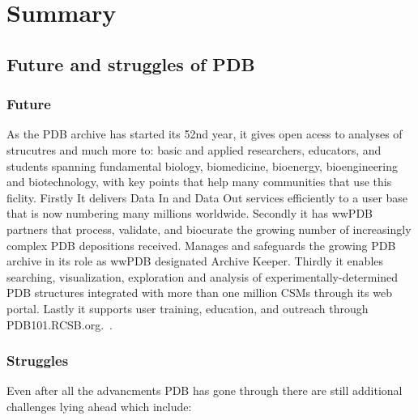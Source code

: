 \documentclass{report}
\begin{document}
\section{Summary}
\subsection{Future and struggles of PDB}
\subsubsection{Future}
As the PDB archive has started its 52nd year, it gives open acess to analyses of strucutres and much more to: basic and applied researchers, educators, and students spanning fundamental biology, biomedicine, bioenergy, bioengineering and biotechnology, with key points that help many communities that use this ficlity. Firstly It delivers Data In and Data Out services efficiently to a user base that is now numbering many millions worldwide. Secondly it has wwPDB partners that process, validate, and biocurate the growing number of increasingly complex PDB depositions received. Manages and safeguards the growing PDB archive in its role as wwPDB designated Archive Keeper. Thirdly it enables searching, visualization, exploration and analysis of experimentally-determined PDB structures integrated with more than one million CSMs through its web portal. Lastly it supports user training, education, and outreach through PDB101.RCSB.org.~\cite{burley1_rcsb_2022}.

\subsubsection{Struggles}
Even after all the advancments PDB has gone through there are still additional challenges lying ahead which include:
\end{document}
